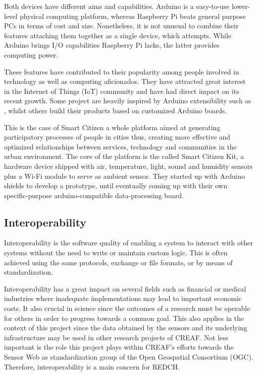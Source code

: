 Both devices have different aims and capabilities. Arduino is a easy-to-use lower-level physical computing platform, whereas Raspberry Pi beats general purpose PCs in terms of cost and size. Nonetheless, it is not unusual to combine their features attaching them together as a single device, which \cite{Arduberry} attempts. While Arduino brings I/O capabilities Raspberry Pi lacks, the latter provides computing power.

These features have contributed to their popularity among people involved in technology as well as computing aficionados. They have attracted great interest in the Internet of Things (IoT) community and have had direct impact on its recent growth. Some project are heavily inspired by Arduino extensibility such as \cite{Thinking-Things}, whilst others build their products based on customized Arduino boards.

This is the case of Smart Citizen a whole platform aimed at generating participatory processes of people in cities thus, creating more effective and optimized relationships between services, technology and communities in the urban environment. The core of the platform is the called Smart Citizen Kit, a hardware device shipped with air, temperature, light, sound and humidity sensors plus a Wi-Fi module to serve as ambient sensor. They started up with Arduino shields to develop a prototype, until eventually coming up with their own specific-purpose arduino-compatible data-processing board.

\subsection{Interoperability}

Interoperability is the software quality of enabling a system to interact with other systems without the need to write or maintain custom logic. This is often achieved using the same protocols, exchange or file formats, or by means of standardization.

Interoperability has a great impact on several fields such as financial or medical industries where inadequate implementations may lead to important economic costs. It also crucial in science since the outcomes of a research must be operable for others in order to progress towards a common goal. This also applies in the context of this project since the data obtained by the sensors and its underlying infrastructure may be used in other research projects of CREAF. Not less important is the role this project plays within CREAF's efforts towards the Sensor Web \cite{SWE} as standardization group of the Open Geospatial Consortium (OGC). Therefore, interoperability is a main concern for REDCH.

